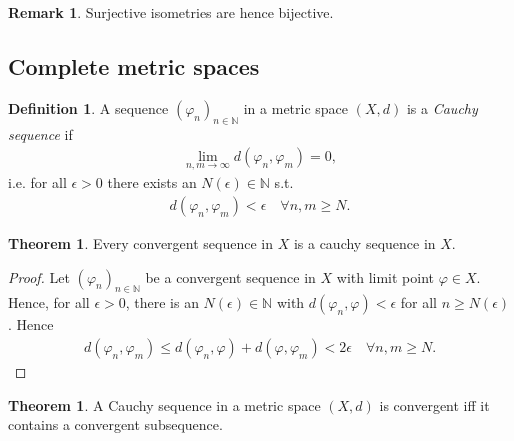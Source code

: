 \documentclass[12pt, a4paper]{article}
\numberwithin{equation}{section}
\theoremstyle{definition}
\theoremstyle{definition}
\newtheorem{defn}[thm]{Definition} %
\newtheorem{remark}[thm]{Remark} %
\newtheorem{theorem}[thm]{Theorem}
\begin{document}
	\begin{remark}
		Surjective isometries are hence bijective.
	\end{remark}
	
	\subsection{Complete metric spaces}
	
	\begin{defn}
		A sequence $(\varphi_n)_{n\in\mathbb N}$ in a metric space $(X, d)$ is a \textit{Cauchy sequence} if 
		\begin{align}
			\lim\limits_{n, m\to\infty} d(\varphi_n, \varphi_m) = 0,
		\end{align}
		i.e. for all $\epsilon > 0$ there exists an $N(\epsilon)\in \mathbb N$ s.t. 
		\begin{align}
			d(\varphi_n, \varphi_m) < \epsilon \quad\forall n, m\geq N.
		\end{align}
	\end{defn}

	\begin{theorem}\label{thrm:convergent_sequence_cauchy_sequence}
		Every convergent sequence in $X$ is a cauchy sequence in $X$.
	\end{theorem}

	\begin{proof}
		Let $(\varphi_n)_{n\in\mathbb N}$ be a convergent sequence in $X$ with limit point $\varphi\in X$. Hence, for all $\epsilon > 0$, there is an $N(\epsilon)\in\mathbb N$ with $d(\varphi_n, \varphi) < \epsilon$ for all $n\geq N(\epsilon)$. Hence
		\begin{align}
			d(\varphi_n, \varphi_m) \leq d(\varphi_n, \varphi) + d(\varphi, \varphi_m) < 2\epsilon \quad\forall n,m\geq N.
		\end{align}
	\end{proof}

	\begin{theorem}\label{thrm:cauchy_convergent_subsequence}
		A Cauchy sequence in a metric space $(X, d)$ is convergent iff it contains a convergent subsequence.
	\end{theorem}
\end{document}

